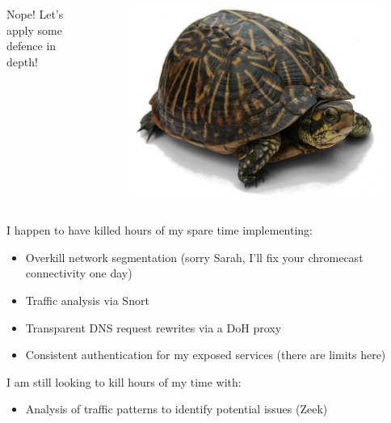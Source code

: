 \documentclass{beamer}
\begin{document}
\begin{frame}
    \begin{columns}
        \begin{column}{0.5\textwidth}
            Nope! Let's apply some defence in depth!
        \end{column}
        \begin{column}{0.5\textwidth}
            \begin{figure}
                \centering
                \includegraphics[width=\textwidth,keepaspectratio]{../resources/turtle.jpg}
            \end{figure}
        \end{column}
    \end{columns}
\end{frame}

\begin{frame}
    I happen to have killed hours of my spare time implementing:
    \begin{itemize}
        \item Overkill network segmentation (sorry Sarah, I'll fix your chromecast connectivity one day)
        \item Traffic analysis via Snort
        \item Transparent DNS request rewrites via a DoH proxy
        \item Consistent authentication for my exposed services (there are limits here)
    \end{itemize}
    I am still looking to kill hours of my time with:
    \begin{itemize}
        \item Analysis of traffic patterns to identify potential issues (Zeek)
    \end{itemize}
\end{frame}
\end{document}
